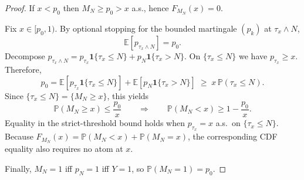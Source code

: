 \documentclass[10pt,a4paper]{amsart}
\newcommand{\E}{\mathbb{E}}
\renewcommand{\P}{\mathbb{P}}
\begin{document}
\begin{proof}
If $x<p_0$ then $M_N\ge p_0>x$ a.s., hence $F_{M_N}(x)=0$.

Fix $x\in[p_0,1)$. By optional stopping for the bounded martingale $(p_k)$ at $\tau_x\wedge N$,
\[
\E[p_{\tau_x\wedge N}] = p_0.
\]
Decompose $p_{\tau_x\wedge N}=p_{\tau_x}\mathbf 1\{\tau_x\le N\}+p_N\mathbf 1\{\tau_x>N\}$.
On $\{\tau_x\le N\}$ we have $p_{\tau_x}\ge x$.
Therefore,
\[
p_0
= \E[p_{\tau_x}\mathbf 1\{\tau_x\le N\}] + \E[p_N\mathbf 1\{\tau_x>N\}]
\;\ge\; x\,\P(\tau_x\le N).
\]
Since $\{\tau_x\le N\}=\{M_N\ge x\}$, this yields
\[
\P(M_N\ge x)\le \frac{p_0}{x}\qquad\Rightarrow\qquad
\P(M_N<x)\ge 1-\frac{p_0}{x}.
\]
Equality in the strict-threshold bound holds when $p_{\tau_x}=x$ a.s.\ on $\{\tau_x\le N\}$.
Because $F_{M_N}(x)=\P(M_N<x)+\P(M_N=x)$, the corresponding CDF equality also requires no atom at $x$.

Finally, $M_N=1$ iff $p_N=1$ iff $Y=1$, so $\P(M_N=1)=p_0$.
\end{proof}
\end{document}
